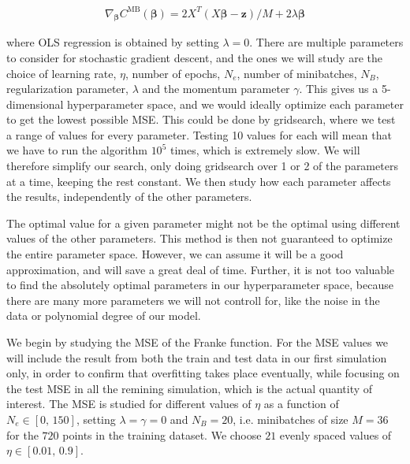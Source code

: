 \documentclass[12pt]{extarticle}
\begin{document}
\begin{align} \label{eq:SGD_gradient}
	\nabla_{\boldsymbol{\beta}}C^\mathrm{MB} (\boldsymbol{\beta})=2 X^T (X \boldsymbol{\beta} - \boldsymbol{z})/M + 2\lambda\boldsymbol{\beta}
\end{align}

where OLS regression is obtained by setting $\lambda=0$. There are multiple parameters to consider for stochastic gradient descent, and the ones we will study are the choice of learning rate, $\eta$, number of epochs, $N_e$, number of minibatches, $N_B$, regularization parameter, $\lambda$ and the momentum parameter $\gamma$. This gives us a 5-dimensional hyperparameter space, and we would ideally optimize each parameter to get the lowest possible MSE. This could be done by gridsearch, where we test a range of values for every parameter. Testing 10 values for each will mean that we have to run the algorithm $10^5$ times, which is extremely slow. We will therefore simplify our search, only doing gridsearch over 1 or 2 of the parameters at a time, keeping the rest constant. We then study how each parameter affects the results, independently of the other parameters.

The optimal value for a given parameter might not be the optimal using different values of the other parameters. This method is then not guaranteed to optimize the entire parameter space. However, we can assume it will be a good approximation, and will save a great deal of time. Further, it is not too valuable to find the absolutely optimal parameters in our hyperparameter space, because there are many more parameters we will not controll for, like the noise in the data or polynomial degree of our model.

We begin by studying the MSE of the Franke function. For the MSE values we will include the result from both the train and test data in our first simulation only, in order to confirm that overfitting takes place eventually, while focusing on the test MSE in all the remining simulation, which is the actual quantity of interest. The MSE is studied for different values of $\eta$ as a function of $N_e\in[0,\,150]$, setting $\lambda=\gamma=0$ and $N_B=20$, i.e. minibatches of size $M=36$ for the $720$ points in the training dataset. We choose $21$ evenly spaced values of $\eta\in[0.01,\,0.9]$.
\end{document}
